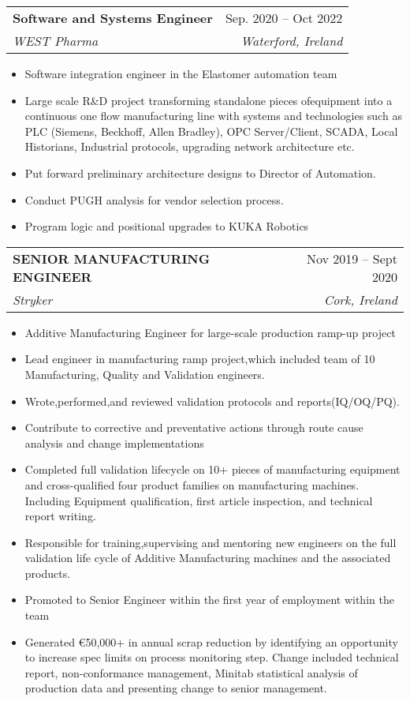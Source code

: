 \documentclass[letterpaper,11pt]{article}
\makeatletter
\newcommand{\resumeItem}[1]{
  \item\small{
    {#1 \vspace{-2pt}}
  }
}
\newcommand{\resumeSubheading}[4]{
  \vspace{-2pt}\item
    \begin{tabular*}{0.97\textwidth}[t]{l@{\extracolsep{\fill}}r}
      \textbf{#1} & #2 \\
      \textit{\small#3} & \textit{\small #4} \\
    \end{tabular*}\vspace{-7pt}
}
\newcommand{\resumeSubSubheading}[2]{
    \item
    \begin{tabular*}{0.97\textwidth}{l@{\extracolsep{\fill}}r}
      \textit{\small#1} & \textit{\small #2} \\
    \end{tabular*}\vspace{-7pt}
}
\newcommand{\resumeSubHeadingListEnd}{\end{itemize}}
\newcommand{\resumeItemListStart}{\begin{itemize}}
\newcommand{\resumeItemListEnd}{\end{itemize}\vspace{-5pt}}
\makeatother
\begin{document}

    \resumeSubheading
      {Software and Systems Engineer}{Sep. 2020 -- Oct 2022}
      {WEST Pharma}{Waterford, Ireland}
      \resumeItemListStart
        \resumeItem{Software integration engineer in the Elastomer automation team}
        \resumeItem{Large scale R&D project transforming standalone pieces ofequipment into a continuous one flow manufacturing line with systems and technologies such as PLC (Siemens, Beckhoff, Allen Bradley), OPC Server/Client, SCADA, Local Historians, Industrial protocols, upgrading network architecture etc.}
        \resumeItem{Put forward preliminary architecture designs to Director of Automation.}
        \resumeItem{Conduct PUGH analysis for vendor selection process.}
        \resumeItem{Program logic and positional upgrades to KUKA Robotics}
    \resumeItemListEnd

    \resumeSubheading
      {SENIOR MANUFACTURING ENGINEER}{Nov 2019 -- Sept 2020}
      {Stryker}{Cork, Ireland}
      \resumeItemListStart
        \resumeItem{Additive Manufacturing Engineer for large-scale production ramp-up project}
        \resumeItem{Lead engineer in manufacturing ramp project,which included team of 10 Manufacturing, Quality and Validation engineers.}
        \resumeItem{Wrote,performed,and reviewed validation protocols and reports(IQ/OQ/PQ).}
        \resumeItem{Contribute to corrective and preventative actions through route cause analysis and change implementations}
        \resumeItem{Completed full validation lifecycle on 10+ pieces of manufacturing equipment and cross-qualified four product families on manufacturing machines. Including Equipment qualification, first article inspection, and technical report writing.}
        \resumeItem{Responsible for training,supervising and mentoring new engineers on the full validation life cycle of Additive Manufacturing machines and the associated products.}
        \resumeItem{Promoted to Senior Engineer within the first year of employment within the team}
        \resumeItem{Generated €50,000+ in annual scrap reduction by identifying an opportunity to increase spec limits on process monitoring step.
        Change included technical report, non-conformance management, Minitab statistical analysis of production data and presenting change to senior management.}
  \resumeSubHeadingListEnd
\end{document}
